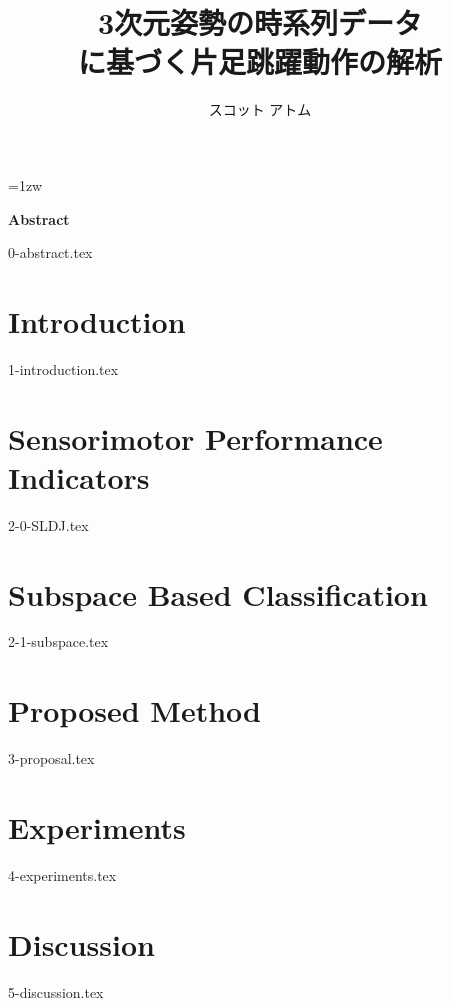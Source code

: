 \documentclass[a4paper,11pt]{report}
\title{3次元姿勢の時系列データ\\
に基づく片足跳躍動作の解析}
\author{スコット アトム}
\begin{document}
\maketitle
\thispagestyle{empty}
\newpage

\thispagestyle{empty}
\vspace*{20pt plus 1fil}
\parindent=1zw
\noindent
\begin{center}
{\Large \bf Abstract}
\vspace{2cm}
\end{center}

{0-abstract.tex}
\par
\vspace{0pt plus 1fil}
\newpage

\tableofcontents
\listoffigures
\listoftables

\pagebreak \setcounter{page}{1}

\chapter{Introduction}
{1-introduction.tex}

\chapter{Sensorimotor Performance Indicators}
{2-0-SLDJ.tex}

\chapter{Subspace Based Classification}
{2-1-subspace.tex}

\chapter{Proposed Method}
{3-proposal.tex}

\chapter{Experiments}
{4-experiments.tex}

\chapter{Discussion}
{5-discussion.tex}
\end{document}
